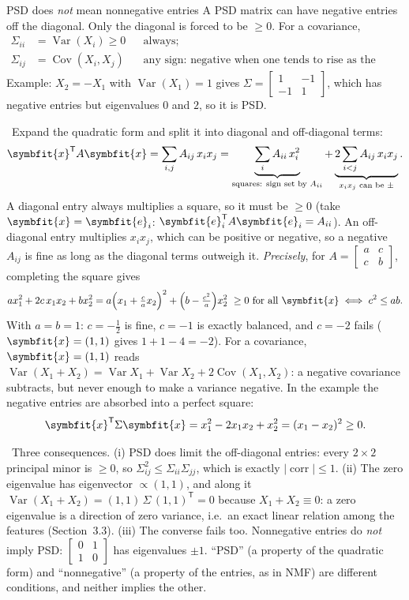 \documentclass[11pt]{article}
\newcommand{\bm}[1]{\symbfit{#1}}
\newcounter{keyfact}
\newcommand{\why}{\par\smallskip{\color{intgreen}\textbf{Why.}}\ }
\newcommand{\sowhat}{\par\smallskip{\color{corpurple}\textbf{So what.}}\ }
\newcommand{\vx}{\bm{x}}
\newcommand{\T}{^{\mathsf T}}
\begin{document}
\begin{keyfactbox}{PSD does \emph{not} mean nonnegative entries}\label{kf:psdentries}
A PSD matrix can have negative entries off the diagonal. Only the diagonal is forced to be $\ge0$. For a covariance,
\[
\begin{aligned}
\Sigma_{ii}&=\operatorname{Var}(X_i)\ge0&&\text{always;}\\
\Sigma_{ij}&=\operatorname{Cov}(X_i,X_j)&&\text{any sign: negative when one tends to rise as the other falls.}
\end{aligned}
\]
Example: $X_2=-X_1$ with $\operatorname{Var}(X_1)=1$ gives $\Sigma=\begin{bmatrix}1&-1\\-1&1\end{bmatrix}$, which has negative entries but
eigenvalues $0$ and $2$, so it is PSD.
\why Expand the quadratic form and split it into diagonal and off-diagonal terms:
\[
\vx\T A\vx=\sum_{i,j}A_{ij}\,x_ix_j=\underbrace{\sum_iA_{ii}\,x_i^2}_{\text{squares: sign set by }A_{ii}}+\underbrace{2\sum_{i<j}A_{ij}\,x_ix_j}_{x_ix_j\text{ can be }\pm} .
\]
A diagonal entry always multiplies a square, so it must be $\ge0$ (take $\vx=\bm e_i$: $\bm e_i\T A\bm e_i=A_{ii}$). An off-diagonal
entry multiplies $x_ix_j$, which can be positive or negative, so a negative $A_{ij}$ is fine as long as the diagonal
terms outweigh it. \emph{Precisely}, for $A=\begin{bmatrix}a&c\\c&b\end{bmatrix}$, completing the square gives
\[
a x_1^2+2c\,x_1x_2+b x_2^2=a\Big(x_1+\tfrac ca x_2\Big)^2+\Big(b-\tfrac{c^2}{a}\Big)x_2^2\ \ge0\ \text{for all }\vx
\iff c^2\le ab .
\]
With $a=b=1$: $c=-\tfrac12$ is fine, $c=-1$ is exactly balanced, and $c=-2$ fails ($\vx=(1,1)$ gives $1+1-4=-2$).
For a covariance, $\vx=(1,1)$ reads $\operatorname{Var}(X_1+X_2)=\operatorname{Var}X_1+\operatorname{Var}X_2+2\operatorname{Cov}(X_1,X_2)$: a negative covariance subtracts,
but never enough to make a variance negative. In the example the negative entries are absorbed into a perfect square:
\[
\vx\T\Sigma\vx=x_1^2-2x_1x_2+x_2^2=(x_1-x_2)^2\ge0 .
\]
\sowhat Three consequences.
(i) PSD does limit the off-diagonal entries: every $2\times2$ principal minor is $\ge0$, so
$\Sigma_{ij}^2\le\Sigma_{ii}\Sigma_{jj}$, which is exactly $|\operatorname{corr}|\le1$.
(ii) The zero eigenvalue has eigenvector $\propto(1,1)$, and along it $\operatorname{Var}(X_1+X_2)=(1,1)\,\Sigma\,(1,1)\T=0$ because $X_1+X_2\equiv0$: a zero eigenvalue is a direction of
zero variance, i.e.\ an exact linear relation among the features (Section~3.3).
(iii) The converse fails too. Nonnegative entries do \emph{not} imply PSD: $\begin{bmatrix}0&1\\1&0\end{bmatrix}$ has eigenvalues $\pm1$.
``PSD'' (a property of the quadratic form) and ``nonnegative'' (a property of the entries, as in NMF) are
different conditions, and neither implies the other.
\end{keyfactbox}
\end{document}
